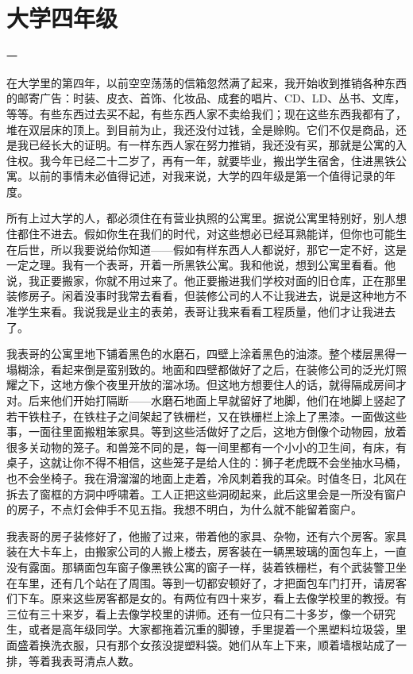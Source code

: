 \chapter{大学四年级}

一 


在大学里的第四年，以前空空荡荡的信箱忽然满了起来，我开始收到推销各种东西的邮寄广告：时装、皮衣、首饰、化妆品、成套的唱片、CD、LD、丛书、文库，等等。有些东西过去买不起，有些东西人家不卖给我们；现在这些东西我都有了，堆在双层床的顶上。到目前为止，我还没付过钱，全是赊购。它们不仅是商品，还是我已经长大的证明。有一样东西人家在努力推销，我还没有买，那就是公寓的入住权。我今年已经二十二岁了，再有一年，就要毕业，搬出学生宿舍，住进黑铁公寓。以前的事情未必值得记述，对我来说，大学的四年级是第一个值得记录的年度。 

所有上过大学的人，都必须住在有营业执照的公寓里。据说公寓里特别好，别人想住都住不进去。假如你生在我们的时代，对这些想必已经耳熟能详，但你也可能生在后世，所以我要说给你知道——假如有样东西人人都说好，那它一定不好，这是一定之理。我有一个表哥，开着一所黑铁公寓。我和他说，想到公寓里看看。他说，我正要搬家，你就不用过来了。他正要搬进我们学校对面的旧仓库，正在那里装修房子。闲着没事时我常去看看，但装修公司的人不让我进去，说是这种地方不准学生来看。我说我是业主的表弟，表哥让我来看看工程质量，他们才让我进去了。 

我表哥的公寓里地下铺着黑色的水磨石，四壁上涂着黑色的油漆。整个楼层黑得一塌糊涂，看起来倒是蛮别致的。地面和四壁都做好了之后，在装修公司的泛光灯照耀之下，这地方像个夜里开放的溜冰场。但这地方想要住人的话，就得隔成房间才对。后来他们开始打隔断——水磨石地面上早就留好了地脚，他们在地脚上竖起了若干铁柱子，在铁柱子之间架起了铁栅栏，又在铁栅栏上涂上了黑漆。一面做这些事，一面往里面搬粗笨家具。等到这些活做好了之后，这地方倒像个动物园，放着很多关动物的笼子。和兽笼不同的是，每一间里都有一个小小的卫生间，有床，有桌子，这就让你不得不相信，这些笼子是给人住的：狮子老虎既不会坐抽水马桶，也不会坐椅子。我在滑溜溜的地面上走着，冷风刺着我的耳朵。时值冬日，北风在拆去了窗框的方洞中呼啸着。工人正把这些洞砌起来，此后这里会是一所没有窗户的房子，不点灯会伸手不见五指。我想不明白，为什么就不能留着窗户。 

我表哥的房子装修好了，他搬了过来，带着他的家具、杂物，还有六个房客。家具装在大卡车上，由搬家公司的人搬上楼去，房客装在一辆黑玻璃的面包车上，一直没有露面。那辆面包车窗子像黑铁公寓的窗子一样，装着铁栅栏，有个武装警卫坐在车里，还有几个站在了周围。等到一切都安顿好了，才把面包车门打开，请房客们下车。原来这些房客都是女的。有两位有四十来岁，看上去像学校里的教授。有三位有三十来岁，看上去像学校里的讲师。还有一位只有二十多岁，像一个研究生，或者是高年级同学。大家都拖着沉重的脚镣，手里提着一个黑塑料垃圾袋，里面盛着换洗衣服，只有那个女孩没提塑料袋。她们从车上下来，顺着墙根站成了一排，等着我表哥清点人数。 

